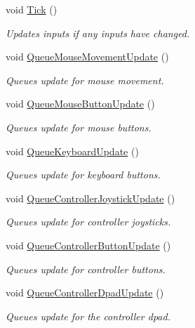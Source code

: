 \begin{DoxyCompactItemize}
void \hyperlink{classfrontier_1_1_input_ab3d78d816a9ae5ed02c9c91900097149}{Tick} ()
\begin{DoxyCompactList}\small\item\em Updates inputs if any inputs have changed. \end{DoxyCompactList}\item 
void \hyperlink{classfrontier_1_1_input_adad2b084e3ddc0ddcf6db9d6f5ebf307}{Queue\+Mouse\+Movement\+Update} ()
\begin{DoxyCompactList}\small\item\em Queues update for mouse movement. \end{DoxyCompactList}\item 
void \hyperlink{classfrontier_1_1_input_a3a78acf75eb63bfcd504b0eca34ce7c2}{Queue\+Mouse\+Button\+Update} ()
\begin{DoxyCompactList}\small\item\em Queues update for mouse buttons. \end{DoxyCompactList}\item 
void \hyperlink{classfrontier_1_1_input_ae3e8301699a5ba6d74fe78cab9410230}{Queue\+Keyboard\+Update} ()
\begin{DoxyCompactList}\small\item\em Queues update for keyboard buttons. \end{DoxyCompactList}\item 
void \hyperlink{classfrontier_1_1_input_adeb3f9c5c6e93ca7406a03314ccfede6}{Queue\+Controller\+Joystick\+Update} ()
\begin{DoxyCompactList}\small\item\em Queues update for controller joysticks. \end{DoxyCompactList}\item 
void \hyperlink{classfrontier_1_1_input_aef3fb33e53dfad959d197f07dd3811ce}{Queue\+Controller\+Button\+Update} ()
\begin{DoxyCompactList}\small\item\em Queues update for controller buttons. \end{DoxyCompactList}\item 
void \hyperlink{classfrontier_1_1_input_a99b2f7b890ffeb5f1079a57af7945892}{Queue\+Controller\+Dpad\+Update} ()
\begin{DoxyCompactList}\small\item\em Queues update for the controller dpad. \end{DoxyCompactList}\end{DoxyCompactItemize}


